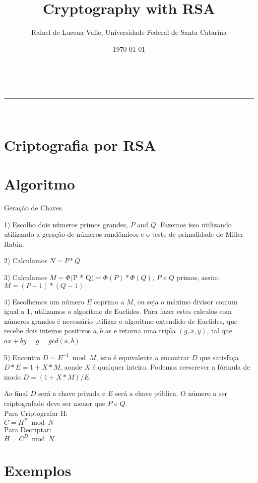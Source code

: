 \documentclass[a4paper,11pt]{article}
\makeatletter
\newcommand{\linia}{\rule{\linewidth}{0.5pt}}
\theoremstyle{mytheor}
\renewcommand{\maketitle}{
\begin{center}
\vspace{2ex}
{\huge \textsc{\@title}}
\vspace{1ex}
\\
\linia\\
\@author \hfill \@date
\vspace{4ex}
\end{center}
}
\makeatother
\begin{document}
\title{Cryptography with RSA}

\author{Rafael de Lucena Valle, Universidade Federal de Santa Catarina}

\date{\today}

\maketitle

\section*{Criptografia por RSA}

\section*{Algoritmo}

Geração de Chaves

1) Escolho dois números primos grandes, $P$ and $Q$.
Fazemos isso utilizando utilizando a geração de números randômicos e o teste de primalidade de Miller Rabin.

2) Calculamos $N = P*Q$

3) Calculamos $M = \Phi($P * Q$) = \Phi(P) * \Phi(Q)$,  $P$ e $Q$ primos, assim: $M = (P - 1)*(Q - 1)$

4) Escolhemos um número $E$ coprimo a $M$, ou seja o máximo divisor comum igual a 1, utilizamos o algoritmo de Euclides. Para fazer estes calculos com números grandes é necessário utilizar o algoritmo extendido de Euclides, que recebe dois inteiros positivos $a, b$ as e retorna uma tripla $(g, x, y)$, tal que $ax + by = g = gcd(a, b)$.

5) Encontro $D = E^{-1} \bmod M$, isto é equivalente a encontrar $D$ que satisfaça $D*E = 1 + X*M$, aonde $X$ é qualquer inteiro. Podemos reescrever a fórmula de modo $D = (1 + X*M) / E$.

Ao final $D$ será a chave privada e $E$ será a chave pública. O número a ser criptografado deve ser menor que $P$ e $Q$.\\

Para Criptografar H:\\
$C = H^E \bmod N$\\

Para Decriptar:\\
$H = C^D \bmod N$

\section*{Exemplos}
\end{document}
